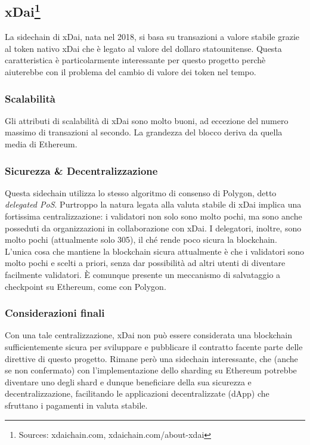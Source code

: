 \documentclass[a4paper, 12pt]{article}
\begin{document}
\newpage
\subsection*{xDai\footnote{Sources: xdaichain.com, xdaichain.com/about-xdai}}
La sidechain di xDai, nata nel 2018, si basa su transazioni a valore stabile grazie al token nativo xDai che è legato al valore del dollaro statounitense.
Questa caratteristica è particolarmente interessante per questo progetto perchè aiuterebbe con il problema del cambio di valore dei token nel tempo.

\subsubsection*{Scalabilità}
Gli attributi di scalabilità di xDai sono molto buoni, ad eccezione del numero massimo di transazioni al secondo.
La grandezza del blocco deriva da quella media di Ethereum.

\subsubsection*{Sicurezza \& Decentralizzazione}
Questa sidechain utilizza lo stesso algoritmo di consenso di Polygon, detto \textit{delegated PoS}.
Purtroppo la natura legata alla valuta stabile di xDai implica una fortissima centralizzazione: i validatori non solo sono molto pochi, ma sono anche posseduti da organizzazioni
in collaborazione con xDai. I delegatori, inoltre, sono molto pochi (attualmente solo 305), il ché rende poco sicura la blockchain.
L'unica cosa che mantiene la blockchain sicura attualmente è che i validatori sono molto pochi e scelti a priori, senza dar possibilità ad altri utenti di diventare facilmente validatori.
È comunque presente un meccanismo di salvataggio a checkpoint su Ethereum, come con Polygon.

\subsubsection*{Considerazioni finali}
Con una tale centralizzazione, xDai non può essere considerata una blockchain sufficientemente sicura per sviluppare e pubblicare il contratto facente parte delle direttive di questo progetto. Rimane però una sidechain interessante, che (anche se non confermato) con l'implementazione dello sharding su Ethereum potrebbe diventare uno degli shard e dunque beneficiare della sua sicurezza e decentralizzazione, facilitando le applicazioni decentralizzate (dApp) che sfruttano i pagamenti in valuta stabile.
\end{document}
